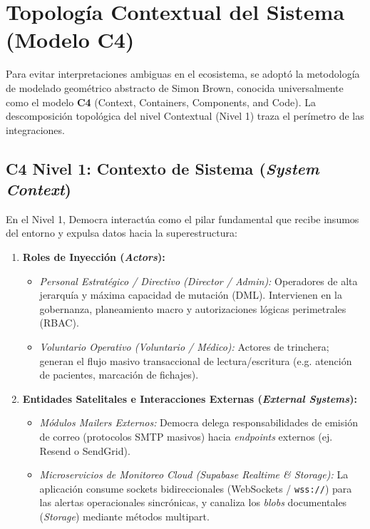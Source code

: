 \documentclass[11pt,a4paper,oneside]{report}
\begin{document}
\section{Topolog\'ia Contextual del Sistema (Modelo C4)}
Para evitar interpretaciones ambiguas en el ecosistema, se adopt\'o la metodolog\'ia de modelado geom\'etrico abstracto de Simon Brown, conocida universalmente como el modelo \textbf{C4} (Context, Containers, Components, and Code). La descomposici\'on topol\'ogica del nivel Contextual (Nivel 1) traza el per\'imetro de las integraciones.

\subsection{C4 Nivel 1: Contexto de Sistema (\textit{System Context})}
En el Nivel 1, Democra interact\'ua como el pilar fundamental que recibe insumos del entorno y expulsa datos hacia la superestructura:
\begin{enumerate}
    \item \textbf{Roles de Inyecci\'on (\textit{Actors}):} 
    \begin{itemize}
        \item \textit{Personal Estrat\'egico / Directivo (Director / Admin):} Operadores de alta jerarqu\'ia y m\'axima capacidad de mutaci\'on (DML). Intervienen en la gobernanza, planeamiento macro y autorizaciones l\'ogicas perimetrales (RBAC). 
        \item \textit{Voluntario Operativo (Voluntario / M\'edico):} Actores de trinchera; generan el flujo masivo transaccional de lectura/escritura (e.g. atenci\'on de pacientes, marcaci\'on de fichajes). 
    \end{itemize}
    \item \textbf{Entidades Satelitales e Interacciones Externas (\textit{External Systems}):} 
    \begin{itemize}
        \item \textit{M\'odulos Mailers Externos:} Democra delega responsabilidades de emisi\'on de correo (protocolos SMTP masivos) hacia \textit{endpoints} externos (ej. Resend o SendGrid).
        \item \textit{Microservicios de Monitoreo Cloud (Supabase Realtime \& Storage):} La aplicaci\'on consume sockets bidireccionales (WebSockets / \texttt{wss://}) para las alertas operacionales sincr\'onicas, y canaliza los \textit{blobs} documentales (\textit{Storage}) mediante m\'etodos multipart.
    \end{itemize}
\end{enumerate}
\end{document}
